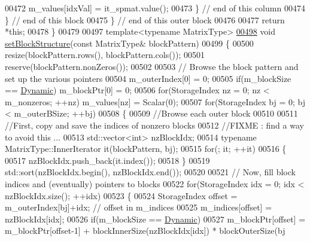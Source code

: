 \begin{DoxyCode}
00472             m\_values[idxVal] = it\_spmat.value();
00473           \} \textcolor{comment}{// end of this column}
00474         \} \textcolor{comment}{// end of this block}
00475       \} \textcolor{comment}{// end of this outer block}
00476 
00477       \textcolor{keywordflow}{return} *\textcolor{keyword}{this};
00478     \}
00479 
00497     \textcolor{keyword}{template}<\textcolor{keyword}{typename} MatrixType>
\hyperlink{group___sparse_core___module_a40891e477661e68bc870319d1379c7aa}{00498}     \textcolor{keywordtype}{void} \hyperlink{group___sparse_core___module_a40891e477661e68bc870319d1379c7aa}{setBlockStructure}(\textcolor{keyword}{const} MatrixType& blockPattern)
00499     \{
00500       resize(blockPattern.rows(), blockPattern.cols());
00501       reserve(blockPattern.nonZeros());
00502 
00503       \textcolor{comment}{// Browse the block pattern and set up the various pointers}
00504       m\_outerIndex[0] = 0;
00505       \textcolor{keywordflow}{if}(m\_blockSize == \hyperlink{namespace_eigen_ad81fa7195215a0ce30017dfac309f0b2}{Dynamic}) m\_blockPtr[0] = 0;
00506       \textcolor{keywordflow}{for}(StorageIndex nz = 0; nz < m\_nonzeros; ++nz) m\_values[nz] = Scalar(0);
00507       \textcolor{keywordflow}{for}(StorageIndex bj = 0; bj < m\_outerBSize; ++bj)
00508       \{
00509         \textcolor{comment}{//Browse each outer block}
00510 
00511         \textcolor{comment}{//First, copy and save the indices of nonzero blocks}
00512         \textcolor{comment}{//FIXME : find a way to avoid this ...}
00513         std::vector<int> nzBlockIdx;
00514         \textcolor{keyword}{typename} MatrixType::InnerIterator it(blockPattern, bj);
00515         \textcolor{keywordflow}{for}(; it; ++it)
00516         \{
00517           nzBlockIdx.push\_back(it.index());
00518         \}
00519         std::sort(nzBlockIdx.begin(), nzBlockIdx.end());
00520 
00521         \textcolor{comment}{// Now, fill block indices and (eventually) pointers to blocks}
00522         \textcolor{keywordflow}{for}(StorageIndex idx = 0; idx < nzBlockIdx.size(); ++idx)
00523         \{
00524           StorageIndex offset = m\_outerIndex[bj]+idx; \textcolor{comment}{// offset in m\_indices}
00525           m\_indices[offset] = nzBlockIdx[idx];
00526           \textcolor{keywordflow}{if}(m\_blockSize == \hyperlink{namespace_eigen_ad81fa7195215a0ce30017dfac309f0b2}{Dynamic})
00527             m\_blockPtr[offset] = m\_blockPtr[offset-1] + blockInnerSize(nzBlockIdx[idx]) * blockOuterSize(bj

\end{DoxyCode}
